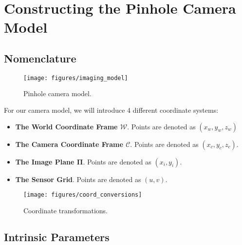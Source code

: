 \section{Constructing the Pinhole Camera Model}

\subsection{Nomenclature}
\begin{figure}[H]
    \centering
    \texttt{[image: figures/imaging\_model]}
    \caption{Pinhole camera model.}
\end{figure}

For our camera model, we will introduce 4 different coordinate systems:
\begin{itemize}[leftmargin=!, itemindent=-4ex]
    \item\textbf{The World Coordinate Frame $\boldsymbol{\mathcal{W}}$}. Points are denoted as $\left(x_w, y_w, z_w\right)$
    \item\textbf{The Camera Coordinate Frame $\boldsymbol{\mathcal{C}}$}. Points are denoted as $\left(x_c, y_c, z_c\right)$.
    \item\textbf{The Image Plane $\boldsymbol{\Pi}$}. Points are denoted as $\left(x_i, y_i\right)$.
    \item\textbf{The Sensor Grid}. Points are denoted as $\left(u, v\right)$.
\end{itemize}




\begin{figure}[H]
    \centering
    \texttt{[image: figures/coord\_conversions]}
    \caption{Coordinate transformations.}
\end{figure}


\subsection{Intrinsic Parameters} \label{sec:intrinsics}

